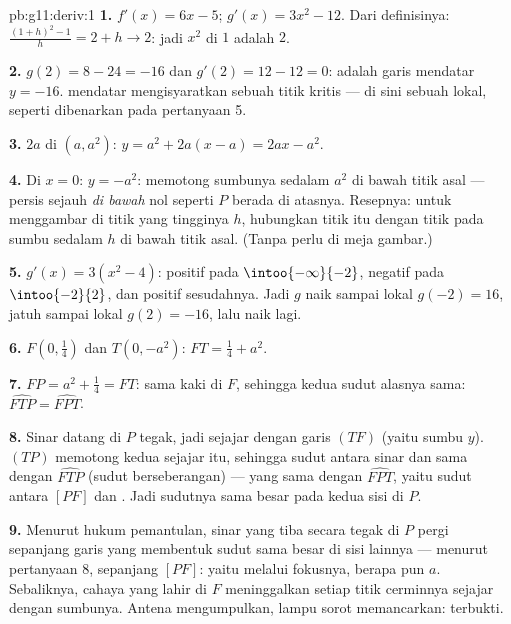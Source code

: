 \begin{solution}{pb:g11:deriv:1}
\textbf{1.} $f'(x) = 6x - 5$; $g'(x) = 3x^2 - 12$. Dari definisinya:
$\frac{(1 + h)^2 - 1}{h} = 2 + h \to 2$: jadi 
$x^2$ di $1$ adalah $2$.

\textbf{2.} $g(2) = 8 - 24 = -16$ dan $g'(2) = 12 - 12 = 0$:
 adalah garis mendatar $y = -16$. 
mendatar mengisyaratkan sebuah titik kritis --- di sini sebuah  lokal,
seperti dibenarkan  pada pertanyaan 5.

\textbf{3.}  $2a$ di $(a, a^2)$:
$y = a^2 + 2a(x - a) = 2ax - a^2$.

\textbf{4.} Di $x = 0$: $y = -a^2$:  memotong
sumbunya sedalam $a^2$ di bawah titik asal --- persis sejauh
\emph{di bawah} nol seperti $P$ berada di atasnya. Resepnya: untuk menggambar
 di titik yang tingginya $h$, hubungkan titik itu dengan titik
pada sumbu sedalam $h$ di bawah titik asal. (Tanpa perlu  di
meja gambar.)

\textbf{5.} $g'(x) = 3(x^2 - 4)$: positif pada
$\intoo{-\infty}{-2}$, negatif pada $\intoo{-2}{2}$, dan positif
sesudahnya. Jadi $g$ naik sampai  lokal $g(-2) = 16$, jatuh
sampai  lokal $g(2) = -16$, lalu naik lagi.

\textbf{6.} $F\left(0, \frac14\right)$ dan $T(0, -a^2)$:
$FT = \frac14 + a^2$.

\textbf{7.} $FP = a^2 + \frac14 = FT$: sama kaki di $F$, sehingga
kedua sudut alasnya sama: $\widehat{FTP} = \widehat{FPT}$.

\textbf{8.} Sinar datang di $P$ tegak, jadi sejajar
dengan garis $(TF)$ (yaitu sumbu $y$).  $(TP)$ memotong
kedua sejajar itu, sehingga sudut antara sinar dan 
sama dengan $\widehat{FTP}$ (sudut berseberangan) --- yang sama dengan
$\widehat{FPT}$, yaitu sudut antara $[PF]$ dan .
Jadi sudutnya sama besar pada kedua sisi  di $P$.

\textbf{9.} Menurut hukum pemantulan, sinar yang tiba secara
tegak di $P$ pergi sepanjang garis yang membentuk sudut sama besar
di sisi lainnya --- menurut pertanyaan 8, sepanjang $[PF]$: yaitu melalui
fokusnya, berapa pun $a$. Sebaliknya, cahaya yang lahir di $F$ meninggalkan
setiap titik cerminnya sejajar dengan sumbunya. Antena mengumpulkan,
lampu sorot memancarkan: terbukti.


\end{solution}
